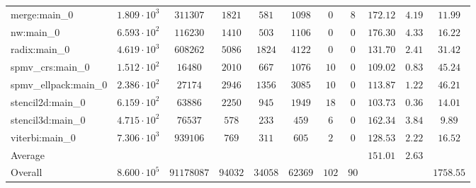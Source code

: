 \begin{tabular}{|l|c|c|c|c|c|c|c|c|c|c|}
merge:main\_0          & $ 1.809 \cdot 10^{3} $ & $ 311307   $ & $ 1821  $ & $ 581   $ & $ 1098  $ & $ 0   $ & $ 8  $ & $ 172.12      $ & $ 4.19    $ & $ 11.99   $ \\
nw:main\_0             & $ 6.593 \cdot 10^{2} $ & $ 116230   $ & $ 1410  $ & $ 503   $ & $ 1106  $ & $ 0   $ & $ 0  $ & $ 176.30      $ & $ 4.33    $ & $ 16.22   $ \\
radix:main\_0          & $ 4.619 \cdot 10^{3} $ & $ 608262   $ & $ 5086  $ & $ 1824  $ & $ 4122  $ & $ 0   $ & $ 0  $ & $ 131.70      $ & $ 2.41    $ & $ 31.42   $ \\
spmv\_crs:main\_0      & $ 1.512 \cdot 10^{2} $ & $ 16480    $ & $ 2010  $ & $ 667   $ & $ 1076  $ & $ 10  $ & $ 0  $ & $ 109.02      $ & $ 0.83    $ & $ 45.24   $ \\
spmv\_ellpack:main\_0  & $ 2.386 \cdot 10^{2} $ & $ 27174    $ & $ 2946  $ & $ 1356  $ & $ 3085  $ & $ 10  $ & $ 0  $ & $ 113.87      $ & $ 1.22    $ & $ 46.21   $ \\
stencil2d:main\_0      & $ 6.159 \cdot 10^{2} $ & $ 63886    $ & $ 2250  $ & $ 945   $ & $ 1949  $ & $ 18  $ & $ 0  $ & $ 103.73      $ & $ 0.36    $ & $ 14.01   $ \\
stencil3d:main\_0      & $ 4.715 \cdot 10^{2} $ & $ 76537    $ & $ 578   $ & $ 233   $ & $ 459   $ & $ 6   $ & $ 0  $ & $ 162.34      $ & $ 3.84    $ & $ 9.89    $ \\
viterbi:main\_0        & $ 7.306 \cdot 10^{3} $ & $ 939106   $ & $ 769   $ & $ 311   $ & $ 605   $ & $ 2   $ & $ 0  $ & $ 128.53      $ & $ 2.22    $ & $ 16.52   $ \\
\hline
Average                & $                    $ & $          $ & $       $ & $       $ & $       $ & $     $ & $    $ & $ 151.01      $ & $ 2.63    $ & $         $ \\
\hline
Overall                & $ 8.600 \cdot 10^{5} $ & $ 91178087 $ & $ 94032 $ & $ 34058 $ & $ 62369 $ & $ 102 $ & $ 90 $ & $             $ & $         $ & $ 1758.55 $ \\
\hline
\end{tabular}
